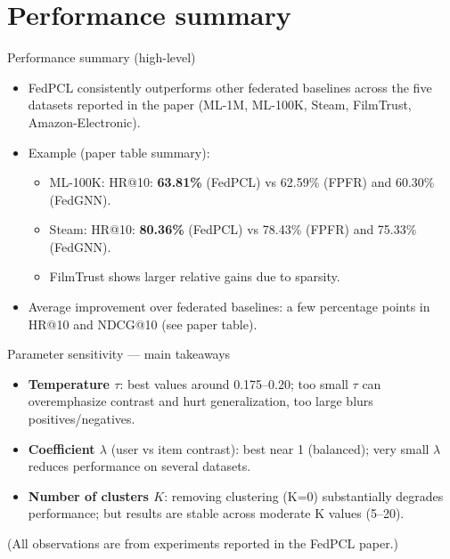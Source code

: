 \documentclass{beamer}
\begin{document}
\section{Performance summary}
\begin{frame}{Performance summary (high-level)}
  \begin{itemize}
    \item FedPCL consistently outperforms other federated baselines across the five datasets reported in the paper (ML-1M, ML-100K, Steam, FilmTrust, Amazon-Electronic).
    \item Example (paper table summary):
      \begin{itemize}
        \item ML-100K: HR@10: \textbf{63.81\%} (FedPCL) vs 62.59\% (FPFR) and 60.30\% (FedGNN).
        \item Steam: HR@10: \textbf{80.36\%} (FedPCL) vs 78.43\% (FPFR) and 75.33\% (FedGNN).
        \item FilmTrust shows larger relative gains due to sparsity.
      \end{itemize}
    \item Average improvement over federated baselines: a few percentage points in HR@10 and NDCG@10 (see paper table).
  \end{itemize}
\end{frame}

\begin{frame}{Parameter sensitivity — main takeaways}
  \begin{itemize}
    \item \textbf{Temperature $\tau$}: best values around 0.175--0.20; too small $\tau$ can overemphasize contrast and hurt generalization, too large blurs positives/negatives.
    \item \textbf{Coefficient $\lambda$} (user vs item contrast): best near 1 (balanced); very small $\lambda$ reduces performance on several datasets.
    \item \textbf{Number of clusters $K$}: removing clustering (K=0) substantially degrades performance; but results are stable across moderate K values (5--20).
  \end{itemize}
  (All observations are from experiments reported in the FedPCL paper.)
\end{frame}
\end{document}
